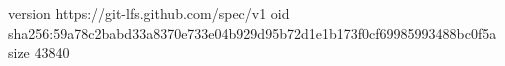 version https://git-lfs.github.com/spec/v1
oid sha256:59a78c2babd33a8370e733e04b929d95b72d1e1b173f0cf69985993488bc0f5a
size 43840

